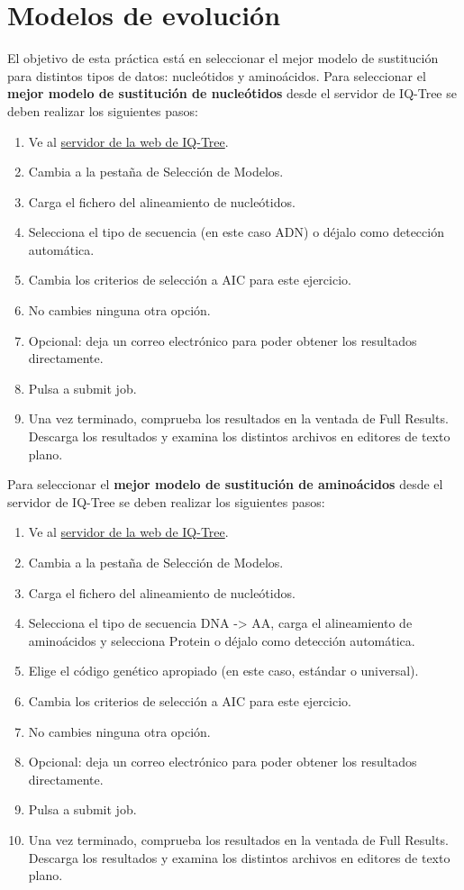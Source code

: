 \section{Modelos de evolución}
El objetivo de esta práctica está en seleccionar el mejor modelo de sustitución para distintos tipos de datos: nucleótidos y aminoácidos. Para seleccionar el \textbf{mejor modelo de sustitución de nucleótidos} desde el servidor de IQ-Tree se deben realizar los siguientes pasos:
\begin{enumerate}
\item Ve al \href{http://iqtree.cibiv.univie.ac.at/}{servidor de la web de IQ-Tree}.
\item Cambia a la pestaña de Selección de Modelos.
\item Carga el fichero del alineamiento de nucleótidos.
\item Selecciona el tipo de secuencia (en este caso ADN) o déjalo como detección automática.
\item Cambia los criterios de selección a AIC para este ejercicio.
\item No cambies ninguna otra opción.
\item Opcional: deja un correo electrónico para poder obtener los resultados directamente.
\item Pulsa a submit job.
\item Una vez terminado, comprueba los resultados en la ventada de Full Results. Descarga los resultados y examina los distintos archivos en editores de texto plano.
\end{enumerate}

Para seleccionar el \textbf{mejor modelo de sustitución de aminoácidos} desde el servidor de IQ-Tree se deben realizar los siguientes pasos:
\begin{enumerate}
\item Ve al \href{http://iqtree.cibiv.univie.ac.at/}{servidor de la web de IQ-Tree}.
\item Cambia a la pestaña de Selección de Modelos.
\item Carga el fichero del alineamiento de nucleótidos.
\item Selecciona el tipo de secuencia DNA -> AA, carga el alineamiento de aminoácidos y selecciona Protein o déjalo como detección automática.
\item Elige el código genético apropiado (en este caso, estándar o universal).
\item Cambia los criterios de selección a AIC para este ejercicio.
\item No cambies ninguna otra opción.
\item Opcional: deja un correo electrónico para poder obtener los resultados directamente.
\item Pulsa a submit job.
\item Una vez terminado, comprueba los resultados en la ventada de Full Results. Descarga los resultados y examina los distintos archivos en editores de texto plano.
\end{enumerate}

